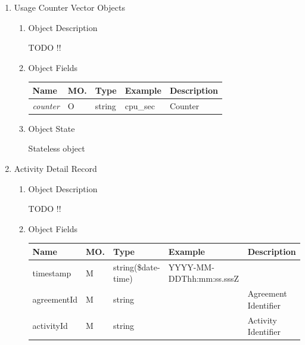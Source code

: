 \break

\begin{enumerate}

\item Usage Counter Vector Objects

\begin{enumerate}

\item Object Description

TODO !!

\item Object Fields

\begin{center}
\begin{tabular}{|p{3cm}|l|p{3cm}|p{3cm}|p{4cm}|} 
\hline
\rowcolor{lightgray}	Name	& MO.	& Type	& Example & 	Description \\
\hline

{\it counter} 	& O & string & cpu\_sec		& Counter \\
\hline 		

\end{tabular}
\end{center}

\item Object State

Stateless object

\end{enumerate}

\item Activity Detail Record

\begin{enumerate}

\item Object Description

TODO !!

\item Object Fields

\begin{center}
\begin{tabular}{|p{3cm}|l|p{3cm}|p{3cm}|p{4cm}|} 
\hline
\rowcolor{lightgray}	Name	& MO.	& Type	& Example & 	Description \\
\hline

timestamp 			& M & string(\$date-time) 	&  YYYY-MM-DDThh:mm:ss.sssZ	&  \\
\hline

agreementId 		& M & string 				&  							&  Agreement Identifier \\
\hline	

activityId 			& M & string 				&  							&  Activity Identifier \\
\hline


\end{tabular}
\end{center}
\end{enumerate}
\end{enumerate}

